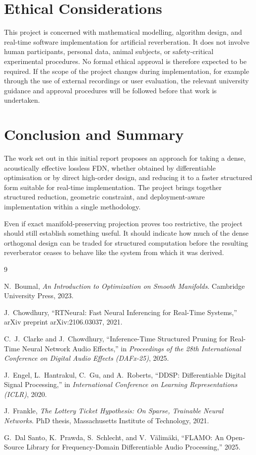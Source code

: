 \documentclass[12pt,a4paper]{article}
\begin{document}
\section{Ethical Considerations}

This project is concerned with mathematical modelling, algorithm design, and
real-time software implementation for artificial reverberation. It does not
involve human participants, personal data, animal subjects, or safety-critical
experimental procedures. No formal ethical approval is therefore expected to be
required. If the scope of the project changes during implementation, for
example through the use of external recordings or user evaluation, the relevant
university guidance and approval procedures will be followed before that work is
undertaken.


\section{Conclusion and Summary}

The work set out in this initial report proposes an approach for taking a dense,
acoustically effective lossless FDN, whether obtained by differentiable
optimisation or by direct high-order design, and reducing it to a faster
structured form suitable for real-time implementation. The project brings
together structured reduction, geometric constraint, and deployment-aware
implementation within a single methodology.

Even if exact manifold-preserving projection proves too restrictive, the project
should still establish something useful. It should indicate how much of the
dense orthogonal design can be traded for structured computation before the
resulting reverberator ceases to behave like the system from which it was
derived.

\begin{thebibliography}{9}

N.\ Boumal,
\textit{An Introduction to Optimization on Smooth Manifolds}.
Cambridge University Press, 2023.

J.\ Chowdhury,
``RTNeural: Fast Neural Inferencing for Real-Time Systems,''
arXiv preprint arXiv:2106.03037, 2021.

C.\ J.\ Clarke and J.\ Chowdhury,
``Inference-Time Structured Pruning for Real-Time Neural Network Audio Effects,''
in \textit{Proceedings of the 28th International Conference on Digital Audio Effects (DAFx-25)}, 2025.

J.\ Engel, L.\ Hantrakul, C.\ Gu, and A.\ Roberts,
``DDSP: Differentiable Digital Signal Processing,''
in \textit{International Conference on Learning Representations (ICLR)}, 2020.

J.\ Frankle,
\textit{The Lottery Ticket Hypothesis: On Sparse, Trainable Neural Networks}.
PhD thesis, Massachusetts Institute of Technology, 2021.

G.\ Dal Santo, K.\ Prawda, S.\ Schlecht, and V.\ V{\"a}lim{\"a}ki,
``FLAMO: An Open-Source Library for Frequency-Domain Differentiable Audio Processing,''
2025.

\end{thebibliography}
\end{document}
